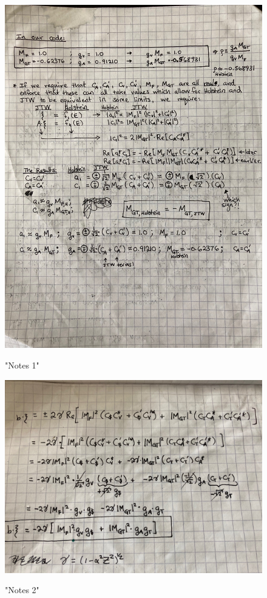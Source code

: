 \begin{figure}[htb]
	\centering
	{\includegraphics[width=.999\linewidth]
	{Figures/oldnotes_holstein_jtw/image1.jpg} }
	\caption{"Notes 1"}
	\label{fig:notes1}
\end{figure}

\begin{figure}[htb]
	\centering
	{\includegraphics[width=.999\linewidth]
	{Figures/oldnotes_holstein_jtw/image2.jpg} }
	\caption{"Notes 2"}
	\label{fig:notes2}
\end{figure}

